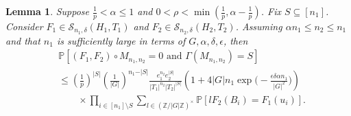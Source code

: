 \documentclass[12pt]{amsart}
\newtheorem{lemma}[theorem]{Lemma}
\theoremstyle{definition}
\newcommand{\PPP}{\mathbb{P}}
\newcommand{\SSS}[3]{\mathcal{S}_{#1}(#2,#3)}
\newcommand{\Mnot}{M_{n_1,n_2}}
\newcommand{\abs}[1]{\vert#1\vert}
\newcommand{\Z}{\mathbb{Z}}
\begin{document}
\begin{lemma}\label{Lem: depth prob intermediate}
Suppose $\frac{1}{p}<\alpha\leq 1$ and $0<\rho<\min(\frac{1}{p},\alpha-\frac{1}{p})$.
Fix $S\subseteq [n_1]$.
Consider $F_1\in \SSS{n_1,\delta}{H_1}{T_1}$ and $F_2\in \SSS{n_2,\delta}{H_2}{T_2}$.
Assuming $\alpha n_1\leq n_2\leq n_1$ and that $n_1$ is sufficiently large in terms of $G, \alpha,\delta, \epsilon$, then
\begin{align*}
&\PPP[(F_1,F_2)\circ \Mnot=0 \text{ and }\Gamma(\Mnot)=S]\\
&\leq (\tfrac{1}{p})^{\abs{S}} (\tfrac{1}{\abs{G}})^{n_1-\abs{S}}
\frac{e_1^{n_2} e_2^{\abs{S}}}{\abs{T_1}^{n_2} \abs{T_2}^{\abs{S}}}
\left(1+4\abs{G}n_1 \exp\Big(-\frac{\epsilon \delta \alpha n_1}{|G|^2}\Big) \right)\\
&\quad\quad\times \prod_{i\in [n_1]\setminus S} \sum_{l\in (\Z/\abs{G}\Z)^{\times}} \PPP[l F_2(B_i)= F_1(u_i)].
\end{align*}
\end{lemma}
\end{document}
